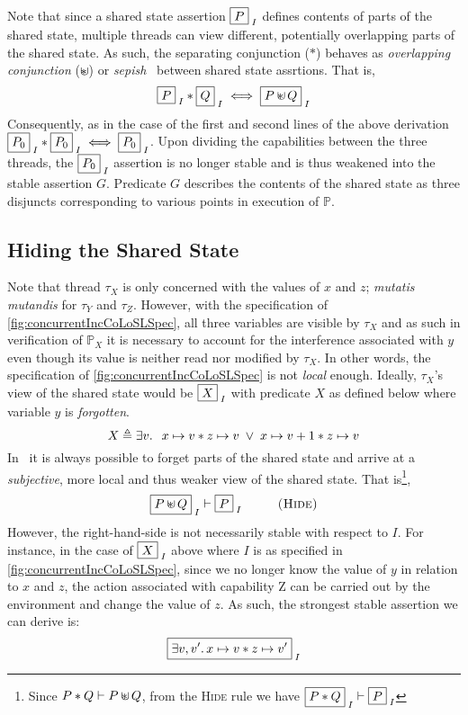 %
Note that since a shared state assertion $\boxed{P}_{\; I}$ defines contents of parts of the shared state, multiple threads can view different, potentially overlapping parts of the shared state. As such, the separating conjunction ($*$) behaves as \emph{overlapping conjunction} ($\sepish$) or \emph{sepish}~\cite{todo} between shared state assrtions. That is,
%
\[
	\shared{P}{I} * \shared{Q}{I} \iff \shared{P \sepish Q}{I}
\]
%
Consequently, as in the case of the first and second lines of the above derivation $\boxed{P_0}_{\; I} * \boxed{P_0}_{\; I} \iff \boxed{P_0}_{\; I}$. Upon dividing the capabilities between the three threads, the $\boxed{P_0}_{\; I}$ assertion is no longer stable and is thus weakened into the stable assertion $G$. Predicate $G$ describes the contents of the shared state as three disjuncts corresponding to various points in execution of $\mathbb{P}$. 
%
%
%
\subsection{Hiding the Shared State}\label{subsec:hide}
Note that thread $\tau_X$ is only concerned with the values of $x$ and $z$; \emph{mutatis mutandis} for $\tau_Y$ and $\tau_Z$. However, with the specification of \fig\ref{fig:concurrentIncCoLoSLSpec}, all three variables are visible by $\tau_X$ and as such in verification of $\mathbb{P}_X$ it is necessary to account for the interference associated with $y$ even though its value is neither read nor modified by $\tau_X$. In other words, the specification of \fig\ref{fig:concurrentIncCoLoSLSpec} is not \emph{local} enough. Ideally, $\tau_X$'s view of the shared state would be $\boxed{X}_{\; I}$ with predicate $X$ as defined below where variable $y$ is \emph{forgotten}.
%
\[
	X \triangleq \exists v.\,\;\; x \mapsto v * z \mapsto v \;\lor\; x \mapsto v+1 * z \mapsto v
\]
%
In \colosl\ it is always possible to forget parts of the shared state and arrive at a \emph{subjective}, more local and thus weaker view of the shared state. That is\footnote{Since $P * Q \vdash P \sepish Q$, from the \textsc{Hide} rule we have $\boxed{P * Q}_{\; I} \vdash \boxed{P}_{\; I}$},
%
\[
	\shared{P \sepish Q}{I} \vdash \shared{P}{I} \hspace*{1cm} \textsc{(Hide)}
\]
%
However, the right-hand-side is not necessarily stable with respect to $I$. For instance, in the case of $\boxed{X}_{\; I}$ above where $I$ is as specified in \fig\ref{fig:concurrentIncCoLoSLSpec}, since we no longer know the value of $y$ in relation to $x$ and $z$, the action associated with capability \textsf{Z} can be carried out by the environment and change the value of $z$. As such, the strongest stable assertion we can derive is: 
%
\[
	\boxed{\exists v, v'.\,  x \mapsto v * z \mapsto v'}_{\; I}
\]
%
%
